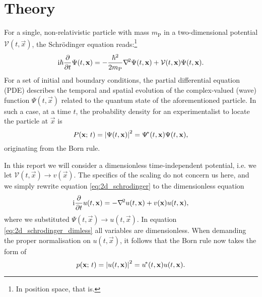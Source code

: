 
\section{Theory}\label{sec:theory}
    For a single, non-relativistic particle with mass $m_\mathrm{P}$ in a two-dimensional potential $\mathcal{V}(t, \vec{x})$, the Schrödinger equation reads:\footnote{In position space, that is.}
    \begin{equation}\label{eq:2d_schrodinger}
        \mathrm{i} \hbar \pdv{}{t}\Psi(t, \mathbf{x}) = -\frac{\hbar^2}{2m_\mathrm{P}}\nabla^{\!2} \Psi(t, \mathbf{x})  + \mathcal{V}(t, \mathbf{x}) \Psi(t, \mathbf{x}).
    \end{equation}
    For a set of initial and boundary conditions, the partial differential equation (PDE) describes the temporal and spatial evolution of the complex-valued (wave) function $\Psi(t, \vec{x})$ related to the quantum state of the aforementioned particle. In such a case, at a time $t$, the probability density for an experimentalist to locate the particle at $\vec{x}$ is
    \begin{equation}\label{eq:2d_bornrule}
        P(\mathbf{x}; \, t) = \abs{\Psi(t, \mathbf{x})}^2 = \Psi^{\!*}(t, \mathbf{x}) \Psi(t, \mathbf{x}),
    \end{equation} 
    originating from the Born rule.

    In this report we will consider a dimensionless time-independent potential, i.e. we let $\mathcal{V}(t, \vec{x}) \to v(\vec{x})$. The specifics of the scaling do not concern us here, and we simply rewrite equation \eqref{eq:2d_schrodinger} to the dimensionless equation
    \begin{equation}\label{eq:2d_schrodinger_dimless}
        \mathrm{i} \pdv{}{t}u(t, \mathbf{x}) = - \nabla^{\!2}u(t, \mathbf{x})+ v(\mathbf{x})u(t, \mathbf{x}),
    \end{equation}
    where we substituted $\Psi(t, \vec{x}) \to u(t, \vec{x})$. In equation \eqref{eq:2d_schrodinger_dimless} all variables are dimensionless. When demanding the proper normalisation on $u(t,\vec{x})$, it follows that the Born rule now takes the form of
    \begin{equation}\label{eq:2d_bornrule_dimless}
        p(\mathbf{x}; \, t) = \abs{u(t, \mathbf{x})}^2 = u^{\!*} (t, \mathbf{x})u(t, \mathbf{x}).
    \end{equation}

